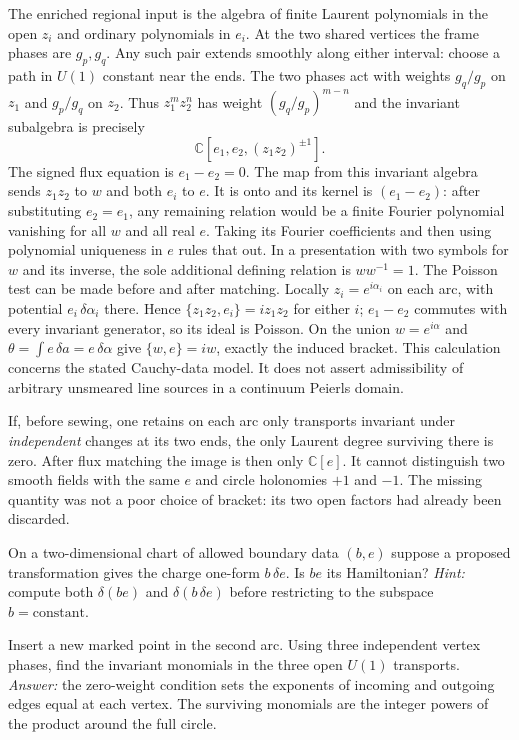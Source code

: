 The enriched regional input is the algebra of finite Laurent polynomials in the open $z_i$ and ordinary polynomials in $e_i$. At the two shared vertices the frame phases are $g_p,g_q$. Any such pair extends smoothly along either interval: choose a path in $U(1)$ constant near the ends. The two phases act with weights $g_q/g_p$ on $z_1$ and $g_p/g_q$ on $z_2$. Thus $z_1^m z_2^n$ has weight $(g_q/g_p)^{m-n}$ and the invariant subalgebra is precisely
\[
 \mathbb C[e_1,e_2,(z_1z_2)^{\pm1}] .
\]
The signed flux equation is $e_1-e_2=0$. The map from this invariant algebra sends $z_1z_2$ to $w$ and both $e_i$ to $e$. It is onto and its kernel is $(e_1-e_2)$: after substituting $e_2=e_1$, any remaining relation would be a finite Fourier polynomial vanishing for all $w$ and all real $e$. Taking its Fourier coefficients and then using polynomial uniqueness in $e$ rules that out. In a presentation with two symbols for $w$ and its inverse, the sole additional defining relation is $w w^{-1}=1$. The Poisson test can be made before and after matching. Locally $z_i=e^{i\alpha_i}$ on each arc, with potential $e_i\,\delta\alpha_i$ there. Hence $\{z_1z_2,e_i\}=i z_1z_2$ for either $i$; $e_1-e_2$ commutes with every invariant generator, so its ideal is Poisson. On the union $w=e^{i\alpha}$ and $\theta=\int e\,\delta a=e\,\delta\alpha$ give $\{w,e\}=i w$, exactly the induced bracket. This calculation concerns the stated Cauchy-data model. It does not assert admissibility of arbitrary unsmeared line sources in a continuum Peierls domain.

If, before sewing, one retains on each arc only transports invariant under \emph{independent} changes at its two ends, the only Laurent degree surviving there is zero. After flux matching the image is then only $\mathbb C[e]$. It cannot distinguish two smooth fields with the same $e$ and circle holonomies $+1$ and $-1$. The missing quantity was not a poor choice of bracket: its two open factors had already been discarded.

\begin{exercise}
On a two-dimensional chart of allowed boundary data $(b,e)$ suppose a proposed transformation gives the charge one-form $b\,\delta e$. Is $b e$ its Hamiltonian? \emph{Hint:} compute both $\delta(be)$ and $\delta(b\,\delta e)$ before restricting to the subspace $b=\text{constant}$.
\end{exercise}

\begin{exercise}
Insert a new marked point in the second arc. Using three independent vertex phases, find the invariant monomials in the three open $U(1)$ transports. \emph{Answer:} the zero-weight condition sets the exponents of incoming and outgoing edges equal at each vertex. The surviving monomials are the integer powers of the product around the full circle.
\end{exercise}
